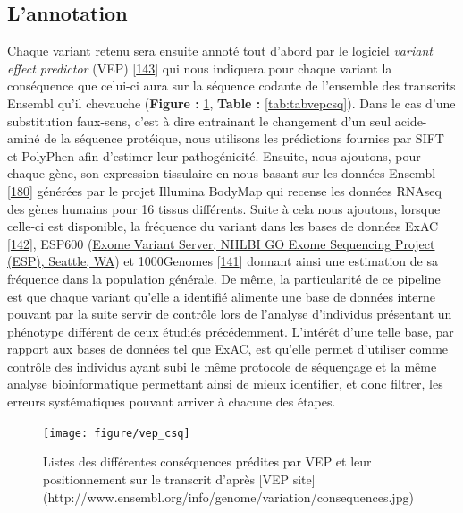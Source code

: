 \documentclass[12pt,twoside]{reedthesis}
\theoremstyle{definition}
\theoremstyle{definition}
\theoremstyle{remark}
\begin{document}
  \newpage
  
  \subsection{L'annotation}\label{lannotation}
  
  Chaque variant retenu sera ensuite annoté tout d'abord par le logiciel
  \emph{variant effect predictor} (VEP)
  {[}\protect\hyperlink{ref-McLaren2016}{143}{]} qui nous indiquera pour
  chaque variant la conséquence que celui-ci aura sur la séquence codante
  de l'ensemble des transcrits Ensembl qu'il chevauche (\textbf{Figure :
  }\ref{fig:figvepcsq}, \textbf{Table : }\ref{tab:tabvepcsq}). Dans le cas
  d'une substitution faux-sens, c'est à dire entrainant le changement d'un
  seul acide-aminé de la séquence protéique, nous utilisons les
  prédictions fournies par SIFT et PolyPhen afin d'estimer leur
  pathogénicité. Ensuite, nous ajoutons, pour chaque gène, son expression
  tissulaire en nous basant sur les données Ensembl
  {[}\protect\hyperlink{ref-Aken2017}{180}{]} générées par le projet
  Illumina BodyMap qui recense les données RNAseq des gènes humains pour
  16 tissus différents. Suite à cela nous ajoutons, lorsque celle-ci est
  disponible, la fréquence du variant dans les bases de données ExAC
  {[}\protect\hyperlink{ref-Lek2016}{142}{]}, ESP600
  (\href{http://evs.gs.washington.edu/EVS/}{Exome Variant Server, NHLBI GO
  Exome Sequencing Project (ESP), Seattle, WA}) et 1000Genomes
  {[}\protect\hyperlink{ref-1000GenomesProjectConsortium2015}{141}{]}
  donnant ainsi une estimation de sa fréquence dans la population
  générale. De même, la particularité de ce pipeline est que chaque
  variant qu'elle a identifié alimente une base de données interne pouvant
  par la suite servir de contrôle lors de l'analyse d'individus présentant
  un phénotype différent de ceux étudiés précédemment. L'intérêt d'une
  telle base, par rapport aux bases de données tel que ExAC, est qu'elle
  permet d'utiliser comme contrôle des individus ayant subi le même
  protocole de séquençage et la même analyse bioinformatique permettant
  ainsi de mieux identifier, et donc filtrer, les erreurs systématiques
  pouvant arriver à chacune des étapes.
  
  \begin{figure}
  
  {\centering \texttt{[image: figure/vep\_csq]} 
  
  }
  
  \caption[Listes des différentes conséquences prédites par VEP et leur positionnement sur le transcrit]{Listes des différentes conséquences prédites par VEP et leur positionnement sur le transcrit d'après [VEP site](http://www.ensembl.org/info/genome/variation/consequences.jpg)}\label{fig:figvepcsq}
  \end{figure}
  
\end{document}
